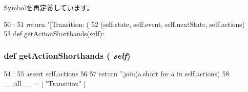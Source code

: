 \hyperlink{classslicc_1_1symbols_1_1Symbol_1_1Symbol_ad8b9328939df072e4740cd9a63189744}{Symbol}を再定義しています。


\begin{DoxyCode}
50                       :
51       return "[Transition: (%
52              (self.state, self.event, self.nextState, self.actions)
53 
    def getActionShorthands(self):
\end{DoxyCode}
\hypertarget{classslicc_1_1symbols_1_1Transition_1_1Transition_a2e3adf778c94f8bf9825535615c9b9e6}{
\subsubsection[{getActionShorthands}]{\setlength{\rightskip}{0pt plus 5cm}def getActionShorthands ( {\em self})}}
\label{classslicc_1_1symbols_1_1Transition_1_1Transition_a2e3adf778c94f8bf9825535615c9b9e6}



\begin{DoxyCode}
54                                  :
55         assert self.actions
56 
57         return ''.join(a.short for a in self.actions)
58 
__all__ = [ "Transition" ]
\end{DoxyCode}


